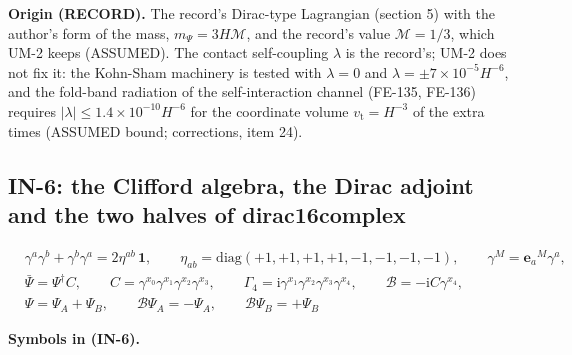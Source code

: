 \documentclass[
  10pt,
]{article}
\begin{document}
\textbf{Origin (RECORD).} The record's Dirac-type Lagrangian (section 5)
with the author's form of the mass, \(m_\Psi = 3H\mathcal{M}\), and the
record's value \(\mathcal{M} = 1/3\), which UM-2 keeps (ASSUMED). The
contact self-coupling \(\lambda\) is the record's; UM-2 does not fix it:
the Kohn-Sham machinery is tested with \(\lambda = 0\) and
\(\lambda = \pm7\times10^{-5}H^{-6}\), and the fold-band radiation of
the self-interaction channel (FE-135, FE-136) requires
\(\lvert\lambda\rvert \le 1.4\times10^{-10}H^{-6}\) for the coordinate
volume \(v_{\mathrm{t}} = H^{-3}\) of the extra times (ASSUMED bound;
corrections, item 24).

\hypertarget{in-6-the-clifford-algebra-the-dirac-adjoint-and-the-two-halves-of-dirac16complex}{%
\subsection{IN-6: the Clifford algebra, the Dirac adjoint and the two
halves of
dirac16complex}\label{in-6-the-clifford-algebra-the-dirac-adjoint-and-the-two-halves-of-dirac16complex}}

\[
\begin{aligned}
&\gamma^a\gamma^b + \gamma^b\gamma^a = 2\eta^{ab}\,\mathbf{1},\qquad
 \eta_{ab} = \mathrm{diag}(+1, +1, +1, +1, -1, -1, -1, -1),\qquad \gamma^M = \mathbf{e}_a{}^M\gamma^a,\\
&\bar\Psi = \Psi^\dagger C,\qquad C = \gamma^{x_0}\gamma^{x_1}\gamma^{x_2}\gamma^{x_3},\qquad
 \Gamma_4 = \mathrm{i}\gamma^{x_1}\gamma^{x_2}\gamma^{x_3}\gamma^{x_4},\qquad \mathcal{B} =
 -\mathrm{i}C\gamma^{x_4},\\
&\Psi = \Psi_A + \Psi_B,\qquad \mathcal{B}\Psi_A = -\Psi_A,\qquad \mathcal{B}\Psi_B = +\Psi_B
\end{aligned} \tag{IN-6}
\]

\textbf{Symbols in (IN-6).}
\end{document}
